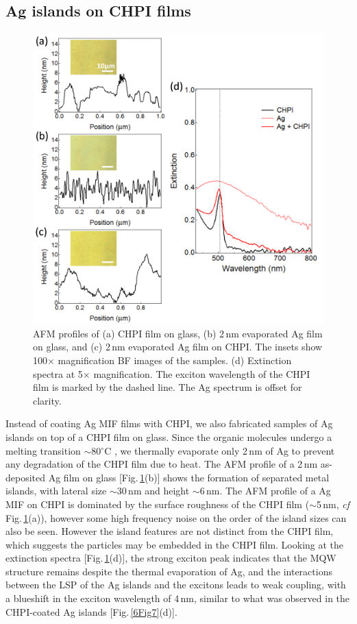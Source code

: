 \subsection{Ag islands on CHPI films}
\begin{figure}[ht] 
\centering    
\includegraphics[width=\textwidth]{Fig8}
\caption{AFM profiles of (a) CHPI film on glass, (b) 2\,nm evaporated Ag film on glass, and (c) 2\,nm evaporated Ag film on CHPI. The insets show 100$\times$ magnification BF images of the samples. (d) Extinction spectra at 5$\times$ magnification. The exciton wavelength of the CHPI film is marked by the dashed line. The Ag spectrum is offset for clarity.}
\label{6Fig8}
\end{figure}
Instead of coating Ag MIF films with CHPI, we also fabricated samples of Ag islands on top of a CHPI film on glass. Since the organic molecules undergo a melting transition $\sim$80$^{\circ}$C \cite{Barman2003}, we thermally evaporate only 2\,nm of Ag to prevent any degradation of the CHPI film due to heat. The AFM profile of a 2\,nm as-deposited Ag film on glass [Fig.\,\ref{6Fig8}(b)] shows the formation of separated metal islands, with lateral size $\sim$30\,nm and height $\sim$6\,nm. The AFM profile of a Ag MIF on CHPI is dominated by the surface roughness of the CHPI film ($\sim$5\,nm, \textit{cf} Fig.\,\ref{6Fig8}(a)), however some high frequency noise on the order of the island sizes can also be seen. However the island features are not distinct from the CHPI film, which suggests the particles may be embedded in the CHPI film. Looking at the extinction spectra [Fig.\,\ref{6Fig8}(d)], the strong exciton peak indicates that the MQW structure remains despite the thermal evaporation of Ag, and the interactions between the LSP of the Ag islands and the excitons leads to weak coupling, with a blueshift in the exciton wavelength of 4\,nm, similar to what was observed in the CHPI-coated Ag islands [Fig.\,\ref{6Fig7}(d)].

